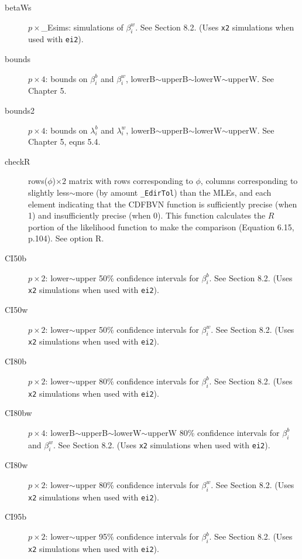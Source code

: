 \documentclass[11pt,titlepage]{article}
\begin{document}
\begin{description}
\item[betaWs] $p\times$\_Esims: simulations of $\beta_i^w$.  See
  Section 8.2.  (Uses \texttt{x2} simulations when used
  with \texttt{ei2}).

\item[bounds] $p\times 4$: bounds on $\beta_i^b$ and $\beta_i^w$,
  lowerB$\sim$upperB$\sim$lowerW$\sim$upperW.  See Chapter
  5.

\item[bounds2] $p\times 4$: bounds on $\lambda_i^b$ and $\lambda_i^w$,
  lowerB$\sim$upperB$\sim$lowerW$\sim$upperW.  See Chapter
  5, eqns 5.4.

\item[checkR] rows($\phi$)$\times 2$ matrix with rows corresponding to
  $\phi$, columns corresponding to slightly less$\sim$more (by amount
  \texttt{\_EdirTol}) than the MLEs, and each element indicating that
  the CDFBVN function is sufficiently precise (when 1) and
  insufficiently precise (when 0).  This function calculates the $R$
  portion of the likelihood function to make the comparison (Equation
  6.15, p.104).  See option R.

\item[CI50b] $p\times 2$: lower$\sim$upper 50\% confidence intervals
  for $\beta_i^b$.  See Section 8.2.  (Uses \texttt{x2}
  simulations when used with \texttt{ei2}).

\item[CI50w] $p\times 2$: lower$\sim$upper 50\% confidence intervals
  for $\beta_i^w$.  See Section 8.2.  (Uses \texttt{x2}
  simulations when used with \texttt{ei2}).

\item[CI80b] $p\times 2$: lower$\sim$upper 80\% confidence intervals
  for $\beta_i^b$.  See Section 8.2.  (Uses \texttt{x2}
  simulations when used with \texttt{ei2}).

\item[CI80bw] $p\times 4$: lowerB$\sim$upperB$\sim$lowerW$\sim$upperW
  80\% confidence intervals for $\beta_i^b$ and $\beta_i^w$.  See
  Section 8.2.  (Uses \texttt{x2} simulations when used
  with \texttt{ei2}).

\item[CI80w] $p\times 2$: lower$\sim$upper 80\% confidence intervals
  for $\beta_i^w$.  See Section 8.2.  (Uses \texttt{x2}
  simulations when used with \texttt{ei2}).

\item[CI95b] $p\times 2$: lower$\sim$upper 95\% confidence intervals
  for $\beta_i^b$.  See Section 8.2.  (Uses \texttt{x2}
  simulations when used with \texttt{ei2}).


\end{description}
\end{document}
